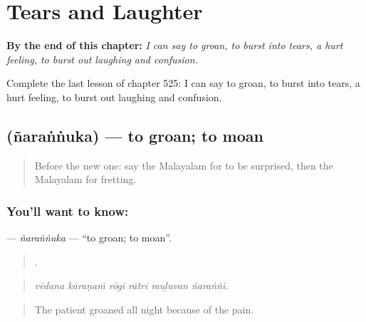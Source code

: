 
\chapter{Tears and Laughter}
\label{ch:ml-tears-and-laughter}

\begin{chapteropening}
\textbf{By the end of this chapter:} \emph{I can say to groan, to burst into tears, a hurt feeling, to burst out laughing and confusion.}

Complete the last lesson of chapter 525: I can say to groan, to burst into tears, a hurt feeling, to burst out laughing and confusion.
\end{chapteropening}

\section[\texorpdfstring{\ml{ഞരങ്ങുക} (ñaraṅṅuka)}{ഞരങ്ങുക (ñaraṅṅuka)}]{ (ñaraṅṅuka) — to groan; to moan}

\label{lesson:ML-C525-narannuka}



\begin{quote}
Before the new one: say the Malayalam for to be surprised, then the Malayalam for fretting.
\end{quote}

\subsection*{You'll want to know: }
\textbf{} — \emph{ñaraṅṅuka} — \textquotedblleft{}to groan; to moan\textquotedblright{}.

\begin{quote}
     .
\end{quote}

\begin{quote}
\emph{vēdana kāraṇaṁ rōgi rātri muḻuvan ñaraṅṅi.}
\end{quote}

\begin{quote}
The patient groaned all night because of the pain.
\end{quote}

